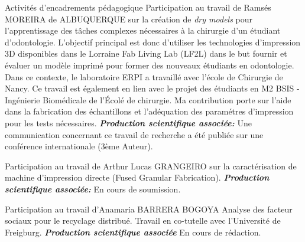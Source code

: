 \begin{rubric}{Activités d'encadrements pédagogique}
\entry*[2017 - 2018]
Participation au travail de Ramsés MOREIRA de ALBUQUERQUE sur la création de \textit{dry models} pour l'apprentissage des tâches complexes nécessaires à la chirurgie d'un étudiant d'odontologie.
L'objectif principal est donc d'utiliser les technologies d'impression 3D disponibles dans le Lorraine Fab Living Lab (LF2L) dans le but fournir et évaluer un modèle imprimé pour former des nouveaux étudiants en odontologie.
Dans ce contexte, le laboratoire ERPI a travaillé avec l'école de Chirurgie de Nancy.
Ce travail est également en lien avec le projet des étudiants en M2 BSIS - Ingénierie Biomédicale de l'Écolé de chirurgie.\newline
Ma contribution porte sur l'aide dans la fabrication des échantillons et l'adéquation des paramétres d'impression pour les tests nécessaires.\newline
\textit{\textbf{Production scientifique associée:}} Une communication concernant ce travail de recherche a été publiée sur une conférence internationale (3ème Auteur).

\entry*[2018-2019]
Participation au travail de Arthur Lucas GRANGEIRO sur  la  caractérisation de machine d'impression directe (Fused Granular Fabrication).\newline
\textit{\textbf{Production scientifique associée:}} En cours de soumission.

\entry*[2018-2019]
Participation au travail d'Anamaria BARRERA BOGOYA Analyse des facteur sociaux pour le recyclage distribué. Travail en co-tutelle avec l'Université de Freigburg.\newline
\textit{\textbf{Production scientifique associée}} En cours de rédaction.




\end{rubric}
